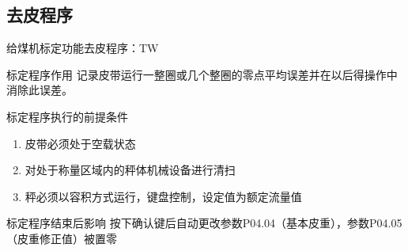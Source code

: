 \documentclass[12pt,hyperref={CJKbookmarks=true}]{beamer} %
\begin{document}
\subsection{去皮程序}
\begin{frame}{给煤机标定功能}{去皮程序：TW}
  		\begin{block}{标定程序作用}
  		记录皮带运行一整圈或几个整圈的零点平均误差并在以后得操作中消除此误差。
\end{block}
\begin{exampleblock}{标定程序执行的前提条件}
  		\begin{enumerate}
				\item 皮带必须处于空载状态
				\item  对处于称量区域内的秤体机械设备进行清扫
				\item   秤必须以容积方式运行，键盘控制，设定值为额定流量值			
			\end{enumerate}
\end{exampleblock}
\begin{alertblock}{标定程序结束后影响}
  		按下确认键后自动更改参数P04.04（基本皮重），参数P04.05（皮重修正值）被置零
\end{alertblock}
	\end{frame}
\end{document}
